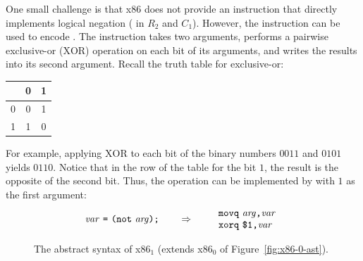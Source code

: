 \documentclass[11pt]{book}
\newcommand{\gray}[1]{{\color{gray} #1}}
\begin{document}
One small challenge is that x86 does not provide an instruction that
directly implements logical negation ( in $R_2$ and $C_1$).
However, the  instruction can be used to encode .
The  instruction takes two arguments, performs a pairwise
exclusive-or ($\mathrm{XOR}$) operation on each bit of its arguments,
and writes the results into its second argument.  Recall the truth
table for exclusive-or:
\begin{center}
\begin{tabular}{l|cc}
   & 0 & 1 \\ \hline
0  & 0 & 1 \\
1  & 1 & 0
\end{tabular}
\end{center}
For example, applying $\mathrm{XOR}$ to each bit of the binary numbers
$0011$ and $0101$ yields $0110$. Notice that in the row of the table
for the bit $1$, the result is the opposite of the second bit.  Thus,
the  operation can be implemented by  with $1$ as
the first argument:
\[
\mathit{var}~ \texttt{=}~ \texttt{(}\texttt{not}~\mathit{arg}\texttt{)}\texttt{;}
\qquad\Rightarrow\qquad
\begin{array}{l}
\texttt{movq}~ \mathit{arg}\texttt{,} \mathit{var}\\
\texttt{xorq}~ \texttt{\$1,} \mathit{var}
\end{array}
\]

\begin{figure}[tp]
\fbox{
\begin{minipage}{0.96\textwidth}
\small    
\[
\begin{array}{lcl}
\Arg &::=&  \gray{\IMM{\Int} \mid \REG{\code{'}\Reg} \mid \DEREF{\Reg}{\Int}} 
     \mid \BYTEREG{\code{'}\Reg} \\
\itm{cc} & ::= & \key{e} \mid \key{l} \mid \key{le} \mid \key{g} \mid \key{ge} \\
\Instr &::=& \gray{ \BININSTR{\code{'addq}}{\Arg}{\Arg} 
       \mid \BININSTR{\code{'subq}}{\Arg}{\Arg} } \\
       &\mid& \gray{ \BININSTR{\code{'movq}}{\Arg}{\Arg} 
       \mid \UNIINSTR{\code{'negq}}{\Arg} } \\
       &\mid& \gray{ \CALLQ{\itm{label}} \mid \RETQ{} 
       \mid \PUSHQ{\Arg} \mid \POPQ{\Arg} \mid \JMP{\itm{label}} } \\
       &\mid& \BININSTR{\code{'xorq}}{\Arg}{\Arg}
       \mid \BININSTR{\code{'cmpq}}{\Arg}{\Arg}\\
       &\mid& \BININSTR{\code{'set}}{\code{'}\itm{cc}}{\Arg} 
       \mid \BININSTR{\code{'movzbq}}{\Arg}{\Arg}\\
       &\mid&  \JMPIF{\code{'}\itm{cc}}{\itm{label}} \\
\Block &::= & \gray{\BLOCK{\itm{info}}{\Instr^{+}}} \\
x86_1 &::= & \gray{\PROGRAM{\itm{info}}{\CFG{\key{(}\itm{label} \,\key{.}\, \Block \key{)}^{+}}}}
\end{array}
\]
\end{minipage}
}
\caption{The abstract syntax of x86$_1$ (extends x86$_0$ of Figure~\ref{fig:x86-0-ast}).}
\label{fig:x86-1}
\end{figure}
\end{document}
